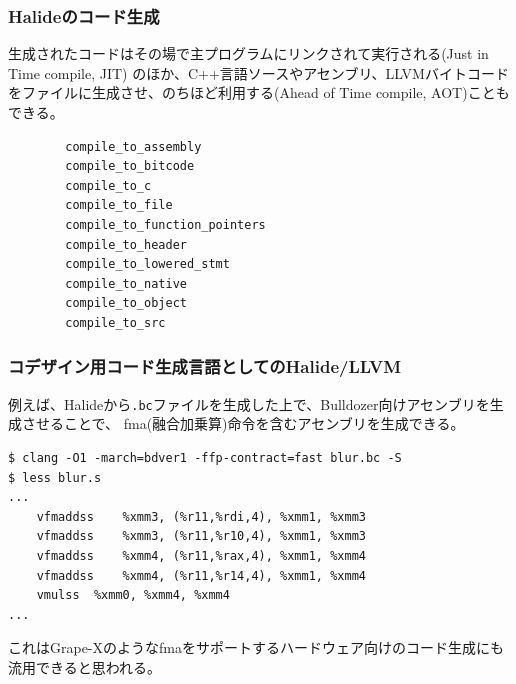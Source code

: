 \documentclass[dvipdfmx,cjk]{beamer}
\begin{document}
\begin{frame}[fragile]\frametitle{Halideのコード生成}

生成されたコードはその場で主プログラムにリンクされて実行される(Just in Time compile, JIT)
のほか、C++言語ソースやアセンブリ、LLVMバイトコードをファイルに生成させ、のちほど利用する(Ahead of Time compile, AOT)こともできる。

\begingroup
    \fontsize{9pt}{10pt}\selectfont
\begin{verbatim}
        compile_to_assembly
        compile_to_bitcode
        compile_to_c
        compile_to_file
        compile_to_function_pointers
        compile_to_header
        compile_to_lowered_stmt
        compile_to_native
        compile_to_object
        compile_to_src
\end{verbatim}
\endgroup

\end{frame}


\begin{frame}[fragile]\frametitle{コデザイン用コード生成言語としてのHalide/LLVM}

例えば、Halideから{\tt .bc}ファイルを生成した上で、Bulldozer向けアセンブリを生成させることで、
fma(融合加乗算)命令を含むアセンブリを生成できる。

\begingroup
    \fontsize{8pt}{9pt}\selectfont
\begin{verbatim}
$ clang -O1 -march=bdver1 -ffp-contract=fast blur.bc -S
$ less blur.s
...
	vfmaddss	%xmm3, (%r11,%rdi,4), %xmm1, %xmm3
	vfmaddss	%xmm3, (%r11,%r10,4), %xmm1, %xmm3
	vfmaddss	%xmm4, (%r11,%rax,4), %xmm1, %xmm4
	vfmaddss	%xmm4, (%r11,%r14,4), %xmm1, %xmm4
	vmulss	%xmm0, %xmm4, %xmm4
...
\end{verbatim}
\endgroup

これはGrape-Xのようなfmaをサポートするハードウェア向けのコード生成にも流用できると思われる。


\end{frame}
\end{document}
